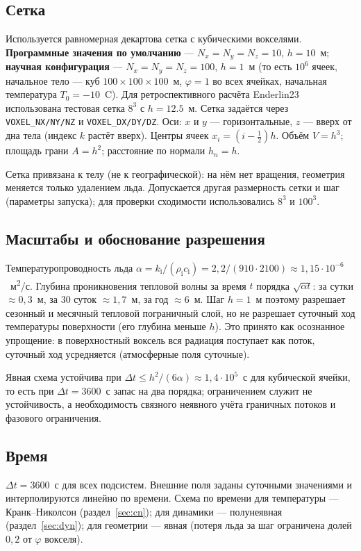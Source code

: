 \documentclass[12pt,a4paper]{article}
\newcommand{\rhoi}{\rho_{\mathrm i}}
\newcommand{\ci}{c_{\mathrm i}}
\newcommand{\ki}{k_{\mathrm i}}
\newcommand{\code}[1]{\texttt{\small #1}}
\begin{document}
\subsection{Сетка}
Используется равномерная декартова сетка с кубическими вокселями. \textbf{Программные значения по умолчанию} --- $N_x=N_y=N_z=10$, $h=10$~м; \textbf{научная конфигурация} --- $N_x=N_y=N_z=100$, $h=1$~м (то есть $10^6$ ячеек, начальное тело --- куб $100\times100\times100$~м, $\varphi=1$ во всех ячейках, начальная температура $T_0=-10$~\textdegree C). Для ретроспективного расчёта Enderlin23 использована тестовая сетка $8^3$ с $h=12.5$~м. Сетка задаётся через \code{VOXEL\_NX/NY/NZ} и \code{VOXEL\_DX/DY/DZ}. Оси: $x$ и $y$ --- горизонтальные, $z$ --- вверх от дна тела (индекс $k$ растёт вверх). Центры ячеек $x_i=(i-\tfrac12)h$. Объём $V=h^3$; площадь грани $A=h^2$; расстояние по нормали $h_n=h$.

Сетка привязана к телу (не к географической): на нём нет вращения, геометрия меняется только удалением льда. Допускается другая размерность сетки и шаг (параметры запуска); для проверки сходимости использовались $8^3$ и $100^3$.

\subsection{Масштабы и обоснование разрешения}
Температуропроводность льда $\alpha=\ki/(\rhoi\ci)=2{,}2/(910\cdot2100)\approx1{,}15\cdot10^{-6}$~м\textsuperscript2/с. Глубина проникновения тепловой волны за время $t$ порядка $\sqrt{\alpha t}$: за сутки $\approx0{,}3$~м, за 30 суток $\approx1{,}7$~м, за год $\approx6$~м. Шаг $h=1$~м поэтому разрешает сезонный и месячный тепловой пограничный слой, но не разрешает суточный ход температуры поверхности (его глубина меньше $h$). Это принято как осознанное упрощение: в поверхностный воксель вся радиация поступает как поток, суточный ход усредняется (атмосферные поля суточные).

Явная схема устойчива при $\Delta t\le h^2/(6\alpha)\approx1{,}4\cdot10^5$~с для кубической ячейки, то есть при $\Delta t=3600$~с запас на два порядка; ограничением служит не устойчивость, а необходимость связного неявного учёта граничных потоков и фазового ограничения.

\subsection{Время}
$\Delta t=3600$~с для всех подсистем. Внешние поля заданы суточными значениями и интерполируются линейно по времени. Схема по времени для температуры --- Кранк--Николсон (раздел~\ref{sec:cn}); для динамики --- полунеявная (раздел~\ref{sec:dyn}); для геометрии --- явная (потеря льда за шаг ограничена долей $0{,}2$ от $\varphi$ вокселя).
\end{document}
